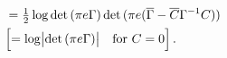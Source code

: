 \documentclass[a4paper,10pt,twocolumn]{article}
\newcommand{\cplx}{\mathbb{C}}
\newcommand{\conj}[1]{\overline{#1}}
\begin{document}
\begin{align}
    &
    = \tfrac12 \log \det{(\pi e \Gamma)}
      \det{(\pi e (\conj{\Gamma} - \conj{C} \Gamma^{-1} C))}
    \notag \\
  \label{eq:cn-proper-entropy}
    &
    \Bigl[
    = \log \bigl\lvert \det{(\pi e \Gamma)} \bigr\rvert
    \quad \text{for } C = 0
    \Bigr]
    \,.
\end{align}
%
\end{document}
